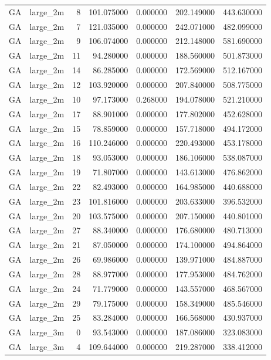 \begin{tabular}{llrrrrr}
GA & large_2m & 8 & 101.075000 & 0.000000 & 202.149000 & 443.630000 \\
GA & large_2m & 7 & 121.035000 & 0.000000 & 242.071000 & 482.099000 \\
GA & large_2m & 9 & 106.074000 & 0.000000 & 212.148000 & 581.690000 \\
GA & large_2m & 11 & 94.280000 & 0.000000 & 188.560000 & 501.873000 \\
GA & large_2m & 14 & 86.285000 & 0.000000 & 172.569000 & 512.167000 \\
GA & large_2m & 12 & 103.920000 & 0.000000 & 207.840000 & 508.775000 \\
GA & large_2m & 10 & 97.173000 & 0.268000 & 194.078000 & 521.210000 \\
GA & large_2m & 17 & 88.901000 & 0.000000 & 177.802000 & 452.628000 \\
GA & large_2m & 15 & 78.859000 & 0.000000 & 157.718000 & 494.172000 \\
GA & large_2m & 16 & 110.246000 & 0.000000 & 220.493000 & 453.178000 \\
GA & large_2m & 18 & 93.053000 & 0.000000 & 186.106000 & 538.087000 \\
GA & large_2m & 19 & 71.807000 & 0.000000 & 143.613000 & 476.862000 \\
GA & large_2m & 22 & 82.493000 & 0.000000 & 164.985000 & 440.688000 \\
GA & large_2m & 23 & 101.816000 & 0.000000 & 203.633000 & 396.532000 \\
GA & large_2m & 20 & 103.575000 & 0.000000 & 207.150000 & 440.801000 \\
GA & large_2m & 27 & 88.340000 & 0.000000 & 176.680000 & 480.713000 \\
GA & large_2m & 21 & 87.050000 & 0.000000 & 174.100000 & 494.864000 \\
GA & large_2m & 26 & 69.986000 & 0.000000 & 139.971000 & 484.887000 \\
GA & large_2m & 28 & 88.977000 & 0.000000 & 177.953000 & 484.762000 \\
GA & large_2m & 24 & 71.779000 & 0.000000 & 143.557000 & 468.567000 \\
GA & large_2m & 29 & 79.175000 & 0.000000 & 158.349000 & 485.546000 \\
GA & large_2m & 25 & 83.284000 & 0.000000 & 166.568000 & 430.937000 \\
GA & large_3m & 0 & 93.543000 & 0.000000 & 187.086000 & 323.083000 \\
GA & large_3m & 4 & 109.644000 & 0.000000 & 219.287000 & 338.412000 \\

\end{tabular}

